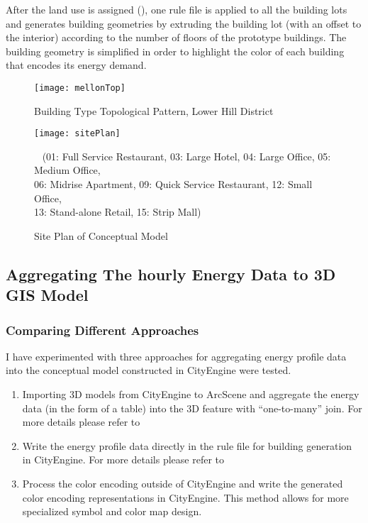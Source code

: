 After the land use is assigned (), one rule file is
applied to all the building lots and generates building geometries by
extruding the building lot (with an offset to the interior) according
to the number of floors of the prototype buildings. The building
geometry is simplified in order to highlight the color of each
building that encodes its energy demand.

\begin{figure}[h!]
  \centering
  \texttt{[image: mellonTop]}
  \caption[Building Type Topology]{Building Type Topological Pattern, Lower Hill District}
  \label{fig:mellonTop}
\end{figure}

\begin{figure}[h!]
  \centering
  \texttt{[image: sitePlan]}
  \caption[Conceptual Model Site Plan]{Site Plan of Conceptual Model}~ (01: Full Service
  Restaurant, 03: Large Hotel, 04: Large Office, 05: Medium Office,
  \\06: Midrise Apartment, 09: Quick Service Restaurant, 12: Small
  Office, \\13: Stand-alone Retail, 15: Strip Mall)
  \label{fig:sitePlan}
\end{figure}

\subsection{Aggregating The hourly Energy Data to 3D GIS Model}\label{sec:aggregateTime}
\subsubsection{Comparing Different Approaches}
I have experimented with three approaches for aggregating energy
profile data into the conceptual model constructed in CityEngine were
tested.
\begin{enumerate}[1)]
\item Importing 3D models from CityEngine to ArcScene and aggregate
  the energy data (in the form of a table) into the 3D feature with
  ``one-to-many'' join. For more details please refer to

\item Write the energy profile data directly in the rule file for
  building generation in CityEngine. For more details please refer to

\item Process the color encoding outside of CityEngine and write the
  generated color encoding representations in CityEngine. This method
  allows for more specialized symbol and color map design.

\end{enumerate}

